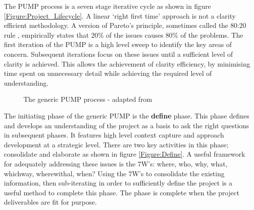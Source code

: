 The PUMP process is a seven stage iterative cycle as shown in figure \ref{Figure:Project_Lifecycle}. 
A linear `right first time' approach is not a clarity efficient methodology.
A version of Pareto's principle, sometimes called the 80:20 rule \citep{Pareto1992}, empirically states that 20\% of the issues causes 80\% of the problems. 
The first iteration of the PUMP is a high level sweep to identify the key areas of concern.
Subsequent iterations focus on these issues until a sufficient level of clarity is achieved.
This allows the achievement of clarity efficiency, by minimising time spent on unnecessary detail while achieving the required level of understanding.

\begin{figure}[!h]
  \centering
{} \quad
{}
\caption{The generic PUMP process - adapted from \cite{chapman}}
\label{Figure:GenericPUMP_Both}
\end{figure}

The initiating phase of the generic PUMP is the \textbf{define} phase.
This phase defines and develops an understanding of the project as a basis to ask the right questions in subsequent phases.
It features high level context capture and approach development at a strategic level.
There are two key activities in this phase; consolidate and elaborate as shown in figure \ref{Figure:Define}.
A useful framework for adequately addressing these issues is the 7W's: where, who, why, what, whichway, wherewithal, when? 
Using the 7W's to consolidate the existing information, then sub-iterating in order to sufficiently define the project is a useful method to complete this phase.
The phase is complete when the project deliverables are fit for purpose.

